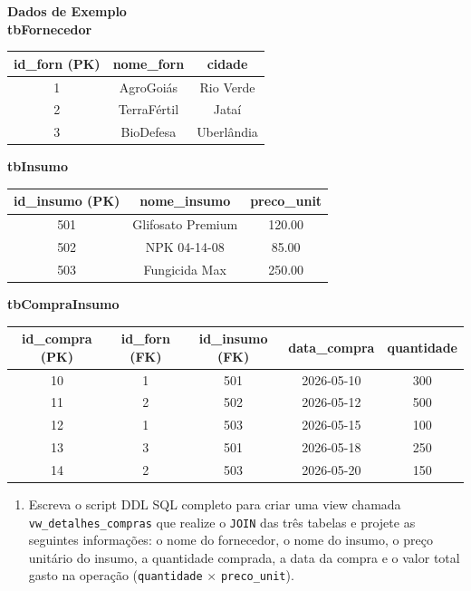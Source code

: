 \documentclass[12pt,a4paper]{article}
\newcommand{\resposta}[1]{}
\begin{document}
\begin{enumerate}[label=\textbf{Exercício \arabic* -}, leftmargin=*, itemsep=2.5em]
\begin{center}
    \textbf{Dados de Exemplo} \\[0.2cm]
    \textbf{tbFornecedor} \\[0.1cm]
    \begin{tabular}{|c|c|c|}
        \hline
        \textbf{id\_forn (PK)} & \textbf{nome\_forn} & \textbf{cidade} \\
        \hline
        1 & AgroGoiás & Rio Verde \\
        2 & TerraFértil & Jataí \\
        3 & BioDefesa & Uberlândia \\
        \hline
    \end{tabular}
    \vspace{0.2cm}
    
    \textbf{tbInsumo} \\[0.1cm]
    \begin{tabular}{|c|c|c|}
        \hline
        \textbf{id\_insumo (PK)} & \textbf{nome\_insumo} & \textbf{preco\_unit} \\
        \hline
        501 & Glifosato Premium & 120.00 \\
        502 & NPK 04-14-08 & 85.00 \\
        503 & Fungicida Max & 250.00 \\
        \hline
    \end{tabular}
    \vspace{0.2cm}

    \textbf{tbCompraInsumo} \\[0.1cm]
    \begin{tabular}{|c|c|c|c|c|}
        \hline
        \textbf{id\_compra (PK)} & \textbf{id\_forn (FK)} & \textbf{id\_insumo (FK)} & \textbf{data\_compra} & \textbf{quantidade} \\
        \hline
        10 & 1 & 501 & 2026-05-10 & 300 \\
        11 & 2 & 502 & 2026-05-12 & 500 \\
        12 & 1 & 503 & 2026-05-15 & 100 \\
        13 & 3 & 501 & 2026-05-18 & 250 \\
        14 & 2 & 503 & 2026-05-20 & 150 \\
        \hline
    \end{tabular}
\end{center}

\begin{enumerate}[label=\textbf{\alph*)}]
    \item Escreva o script DDL SQL completo para criar uma view chamada \texttt{vw\_detalhes\_compras} que realize o \texttt{JOIN} das três tabelas e projete as seguintes informações: o nome do fornecedor, o nome do insumo, o preço unitário do insumo, a quantidade comprada, a data da compra e o valor total gasto na operação (\texttt{quantidade} $\times$ \texttt{preco\_unit}).
    \resposta{4.5cm}


\end{enumerate}
\end{enumerate}
\end{document}
